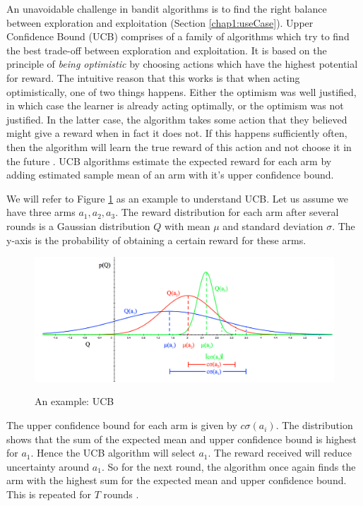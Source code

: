 An unavoidable challenge in bandit algorithms is to find the right balance between exploration and exploitation (Section \ref{chap1:useCase}). Upper Confidence Bound (UCB) comprises of a family of algorithms which try to find the best trade-off between exploration and exploitation. It is based on the principle of \textit{being optimistic} by choosing actions which have the highest potential for reward. The intuitive reason that this works is that when acting optimistically, one of two things happens. Either the optimism was well justified, in which case the learner is already acting optimally, or the optimism was not justified. In the latter case, the algorithm takes some action that they believed might give a reward when in fact it does not. If this happens sufficiently often, then the algorithm will learn the true reward of this action and not choose it in the future \cite{banditalgs}. UCB algorithms estimate the expected reward for each arm by adding estimated sample mean of an arm with it's upper confidence bound. \par

We will refer to Figure \ref{UCB} as an example to understand UCB. Let us assume we have three arms $a_1, a_2, a_3$. The reward distribution for each arm after several rounds is a Gaussian distribution $Q$ with mean $\mu$ and standard deviation $\sigma$. The y-axis is the probability of obtaining a certain reward for these arms. \par

\begin{figure}[h]
    \centering
    \includegraphics[scale=0.28]{Figures/UCB.png}
    \caption{An example: UCB}
    \cite{dsilver}
    \label{UCB}
\end{figure}

The upper confidence bound for each arm is given by $c\sigma(a_i)$. The distribution shows that the sum of the expected mean and upper confidence bound is highest for $a_1$. Hence the UCB algorithm will select $a_1$.
The reward received will reduce uncertainty around $a_1$. So for the next round, the algorithm once again finds the arm with the highest sum for the expected mean and upper confidence bound. This is repeated for $T$ rounds \cite{ankitmab}.

